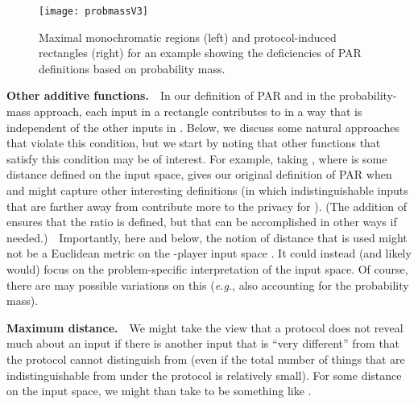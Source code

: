 \documentclass{article}
\theoremstyle{theorem}
\theoremstyle{definition}
\theoremstyle{remark}
\newcommand{\eg}{\emph{e.g.}}
\begin{document}
\begin{figure}[htp]
\begin{center}
\texttt{[image: probmassV3]}
\caption{\small Maximal monochromatic regions (left) and protocol-induced rectangles (right) for an example showing the deficiencies of PAR definitions based on probability mass. }\label{fig:prob-mass}
\end{center}
\end{figure}



\textbf{Other additive functions.}\ \ In our definition of PAR and in the probability-mass approach, each input  in a rectangle contributes to  in a way that is independent of the other inputs in .  Below, we discuss some natural approaches that violate this condition, but we start by noting that other functions that satisfy this condition may be of interest.  For example, taking , where  is some distance defined on the input space, gives our original definition of PAR when  and might capture other interesting definitions (in which indistinguishable inputs that are farther away from  contribute more to the privacy for ).  (The addition of  ensures that the ratio  is defined, but that can be accomplished in other ways if needed.)\ \ Importantly, here and below, the notion of distance that is used might not be a Euclidean metric on the -player input space .  It could instead (and likely would) focus on the problem-specific interpretation of the input space.  Of course, there are may possible variations on this (\eg, also accounting for the probability mass).

\textbf{Maximum distance.}\ \ We might take the view that a protocol does not reveal much about an input  if there is another input that is ``very different'' from  that the protocol cannot distinguish from  (even if the total number of things that are indistinguishable from  under the protocol is relatively small).  For some distance  on the input space, we might than take  to be something like .
\end{document}
